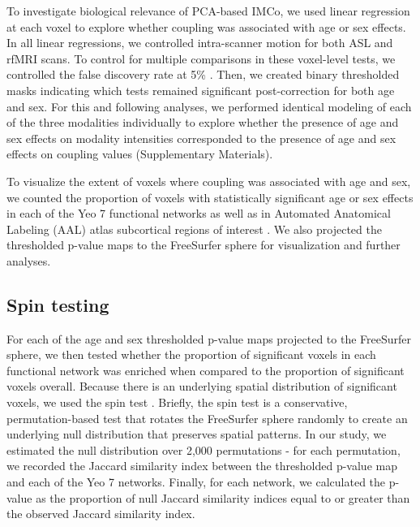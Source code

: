 \documentclass[
  12pt,
]{article}
\begin{document}
To investigate biological relevance of PCA-based IMCo, we used linear regression at each voxel to explore whether coupling was associated with age or sex effects. In all linear regressions, we controlled intra-scanner motion for both ASL and rfMRI scans. To control for multiple comparisons in these voxel-level tests, we controlled the false discovery rate at 5\% \citep{benjaminiControllingFalseDiscovery1995}. Then, we created binary thresholded masks indicating which tests remained significant post-correction for both age and sex. For this and following analyses, we performed identical modeling of each of the three modalities individually to explore whether the presence of age and sex effects on modality intensities corresponded to the presence of age and sex effects on coupling values (Supplementary Materials).

To visualize the extent of voxels where coupling was associated with age and sex, we counted the proportion of voxels with statistically significant age or sex effects in each of the Yeo 7 functional networks as well as in Automated Anatomical Labeling (AAL) atlas subcortical regions of interest \citep{thomasyeoOrganizationHumanCerebral2011, tzourio-mazoyerAutomatedAnatomicalLabeling2002}. We also projected the thresholded p-value maps to the FreeSurfer sphere for visualization and further analyses.

\hypertarget{spin-testing}{%
\subsection{Spin testing}\label{spin-testing}}

For each of the age and sex thresholded p-value maps projected to the FreeSurfer sphere, we then tested whether the proportion of significant voxels in each functional network was enriched when compared to the proportion of significant voxels overall. Because there is an underlying spatial distribution of significant voxels, we used the spin test \citep{alexander-bloch_testing_2018}. Briefly, the spin test is a conservative, permutation-based test that rotates the FreeSurfer sphere randomly to create an underlying null distribution that preserves spatial patterns. In our study, we estimated the null distribution over 2,000 permutations - for each permutation, we recorded the Jaccard similarity index between the thresholded p-value map and each of the Yeo 7 networks. Finally, for each network, we calculated the p-value as the proportion of null Jaccard similarity indices equal to or greater than the observed Jaccard similarity index.
\end{document}
